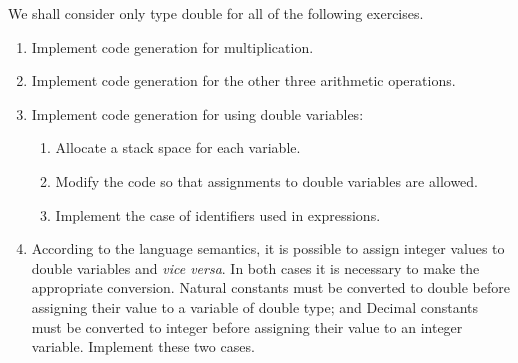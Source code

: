 
We shall consider only type double for all of the following exercises.
\begin{enumerate}
\item Implement code generation for multiplication.
\item Implement code generation for the other three arithmetic operations.
\item Implement code generation for using double variables:
\begin{enumerate}
\item Allocate a stack space for each variable.
\item Modify the code so that assignments to double variables are allowed.
\item Implement the case of identifiers used in expressions.
\end{enumerate}
\item According to the language semantics, it is possible to assign integer values to double variables and \textit{vice versa}. In both cases it is necessary to make the appropriate conversion. Natural constants must be converted to double before assigning their value to a variable of double type; and Decimal constants must be converted to integer before assigning their value to an integer variable. Implement these two cases.
\end{enumerate}
